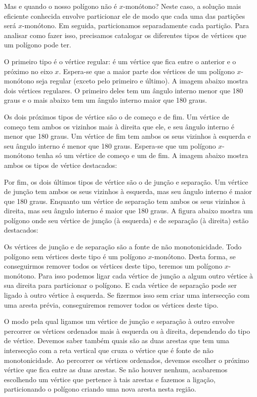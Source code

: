 {{{{{{Mas e quando o nosso polígono não é $x$-monótono? Neste caso, a
solução mais eficiente conhecida envolve particionar ele de modo que
cada uma das partições será $x$-monótono. Em seguida, particionamos
separadamente cada partição. Para analisar como fazer isso, precisamos
catalogar os diferentes tipos de vértices que um polígono pode ter.

O primeiro tipo é o vértice regular: é um vértice que fica entre o
anterior e o próximo no eixo $x$. Espera-se que a maior parte dos
vértices de um polígono $x$-monótono seja regular (exceto pelo
primeiro e último). A imagem abaixo mostra dois vértices regulares. O
primeiro deles tem um ângulo interno menor que 180 graus e o mais
abaixo tem um ângulo interno maior que 180 graus.


Os dois próximos tipos de vértice são o de começo e de fim. Um vértice
de começo tem ambos os vizinhos mais à direita que ele, e seu ângulo
interno é menor que 180 graus. Um vértice de fim tem ambos os seus
vizinhos à esquerda e seu ângulo interno é menor que 180
graus. Espera-se que um polígono $x$-monótono tenha só um vértice de
começo e um de fim. A imagem abaixo mostra ambos os tipos de vértice
destacados:



Por fim, os dois últimos tipos de vértice são o de junção e
separação. Um vértice de junção tem ambos os seus vizinhos à esquerda,
mas seu ângulo interno é maior que 180 graus. Enquanto um vértice de
separação tem ambos os seus vizinhos à direita, mas seu ângulo interno
é maior que 180 graus. A figura abaixo mostra um polígono onde seu
vértice de junção (à esquerda) e de separação (à direita) estão
destacados:


Os vértices de junção e de separação são a fonte de não
monotonicidade. Todo polígono sem vértices deste tipo é um polígono
$x$-monótono. Desta forma, se conseguirmos remover todos os vértices
deste tipo, teremos um polígono $x$-monótono. Para isso podemos ligar
cada vértice de junção a algum outro vértice à sua direita para
particionar o polígono. E cada vértice de separação pode ser ligado à
outro vértice à esquerda. Se fizermos isso sem criar uma intersecção
com uma aresta prévia, conseguiremos remover todos os vértices deste
tipo.

O modo pela qual ligamos um vértice de junção e separação à outro
envolve percorrer os vértices ordenados mais à esquerda ou à direita,
dependendo do tipo de vértice. Devemos saber também quais são as duas
arestas que tem uma intersecção com a reta vertical que cruza o
vértice que é fonte de não monotonicidade. Ao percorrer os vértices
ordenados, devemos escolher o próximo vértice que fica entre as duas
arestas. Se não houver nenhum, acabaremos escolhendo um vértice que
pertence à tais arestas e fazemos a ligação, particionando o polígono
criando uma nova aresta nesta região.

}}}}}}
